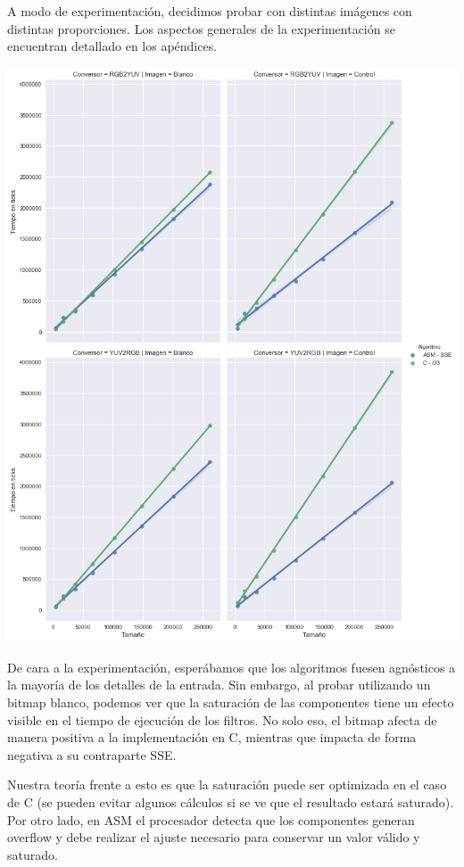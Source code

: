 A modo de experimentación, decidimos probar con distintas imágenes con distintas proporciones. Los aspectos generales de la experimentación se encuentran detallado en los apéndices.

\begin{center}
	\includegraphics[scale=0.5]{img/conversores_blanco.png}
\end{center}

De cara a la experimentación, esperábamos que los algoritmos fuesen agnósticos a la mayoría de los detalles de la entrada. Sin embargo, al probar utilizando un bitmap blanco, podemos ver que la saturación de las componentes tiene un efecto visible en el tiempo de ejecución de los filtros. No solo eso, el bitmap afecta de manera positiva a la implementación en C, mientras que impacta de forma negativa a su contraparte SSE.

Nuestra teoría frente a esto es que la saturación puede ser optimizada en el caso de C (se pueden evitar algunos cálculos si se ve que el resultado estará saturado). Por otro lado, en ASM el procesador detecta que los componentes generan overflow y debe realizar el ajuste necesario para conservar un valor válido y saturado.